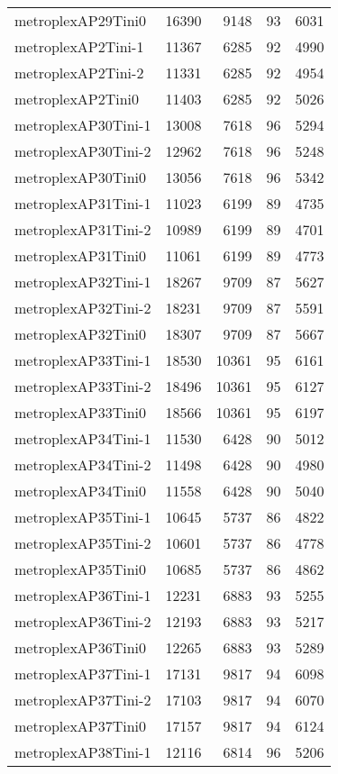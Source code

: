 \begin{longtable}{lrrrr}
metroplexAP29Tini0 & 16390 & 9148 & 93 & 6031 \\
metroplexAP2Tini-1 & 11367 & 6285 & 92 & 4990 \\
metroplexAP2Tini-2 & 11331 & 6285 & 92 & 4954 \\
metroplexAP2Tini0 & 11403 & 6285 & 92 & 5026 \\
metroplexAP30Tini-1 & 13008 & 7618 & 96 & 5294 \\
metroplexAP30Tini-2 & 12962 & 7618 & 96 & 5248 \\
metroplexAP30Tini0 & 13056 & 7618 & 96 & 5342 \\
metroplexAP31Tini-1 & 11023 & 6199 & 89 & 4735 \\
metroplexAP31Tini-2 & 10989 & 6199 & 89 & 4701 \\
metroplexAP31Tini0 & 11061 & 6199 & 89 & 4773 \\
metroplexAP32Tini-1 & 18267 & 9709 & 87 & 5627 \\
metroplexAP32Tini-2 & 18231 & 9709 & 87 & 5591 \\
metroplexAP32Tini0 & 18307 & 9709 & 87 & 5667 \\
metroplexAP33Tini-1 & 18530 & 10361 & 95 & 6161 \\
metroplexAP33Tini-2 & 18496 & 10361 & 95 & 6127 \\
metroplexAP33Tini0 & 18566 & 10361 & 95 & 6197 \\
metroplexAP34Tini-1 & 11530 & 6428 & 90 & 5012 \\
metroplexAP34Tini-2 & 11498 & 6428 & 90 & 4980 \\
metroplexAP34Tini0 & 11558 & 6428 & 90 & 5040 \\
metroplexAP35Tini-1 & 10645 & 5737 & 86 & 4822 \\
metroplexAP35Tini-2 & 10601 & 5737 & 86 & 4778 \\
metroplexAP35Tini0 & 10685 & 5737 & 86 & 4862 \\
metroplexAP36Tini-1 & 12231 & 6883 & 93 & 5255 \\
metroplexAP36Tini-2 & 12193 & 6883 & 93 & 5217 \\
metroplexAP36Tini0 & 12265 & 6883 & 93 & 5289 \\
metroplexAP37Tini-1 & 17131 & 9817 & 94 & 6098 \\
metroplexAP37Tini-2 & 17103 & 9817 & 94 & 6070 \\
metroplexAP37Tini0 & 17157 & 9817 & 94 & 6124 \\
metroplexAP38Tini-1 & 12116 & 6814 & 96 & 5206 \\

\end{longtable}

